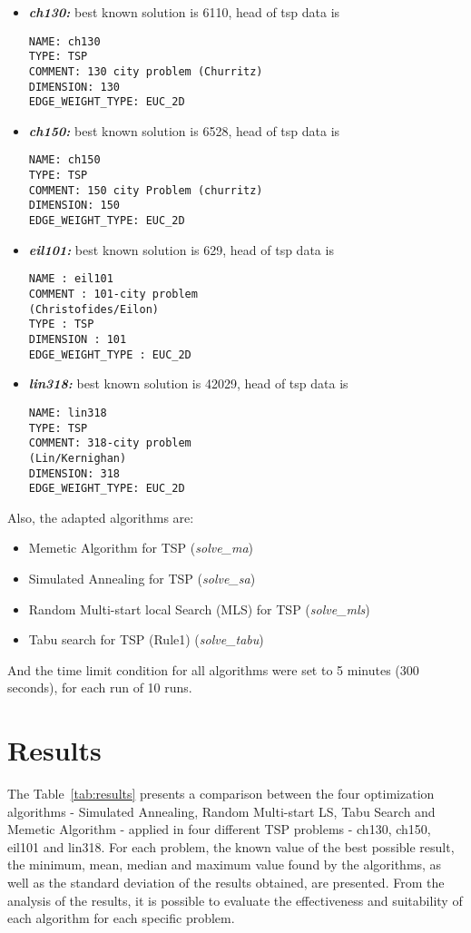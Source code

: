 \documentclass[conference]{IEEEtran}
\begin{document}
\begin{itemize}
	\item \textit{\textbf{ch130:}} best known solution is 6110, head of tsp data is
\begin{verbatim}
NAME: ch130
TYPE: TSP
COMMENT: 130 city problem (Churritz)
DIMENSION: 130
EDGE_WEIGHT_TYPE: EUC_2D
\end{verbatim}
	\item \textit{\textbf{ch150:}} best known solution is 6528, head of tsp data is
\begin{verbatim}
NAME: ch150
TYPE: TSP
COMMENT: 150 city Problem (churritz)
DIMENSION: 150
EDGE_WEIGHT_TYPE: EUC_2D
\end{verbatim}
	\item \textit{\textbf{eil101:}} best known solution is 629, head of tsp data is
\begin{verbatim}
NAME : eil101
COMMENT : 101-city problem 
(Christofides/Eilon)
TYPE : TSP
DIMENSION : 101
EDGE_WEIGHT_TYPE : EUC_2D
\end{verbatim}
	\item \textit{\textbf{lin318:}} best known solution is 42029, head of tsp data is
\begin{verbatim}
NAME: lin318
TYPE: TSP
COMMENT: 318-city problem 
(Lin/Kernighan)
DIMENSION: 318
EDGE_WEIGHT_TYPE: EUC_2D
\end{verbatim}

\end{itemize}

Also, the adapted algorithms are: 

\begin{itemize}
	\item Memetic Algorithm for TSP (\textit{solve\_ma})
	\item Simulated Annealing for TSP (\textit{solve\_sa})
	\item Random Multi-start local Search (MLS) for TSP (\textit{solve\_mls})
	\item Tabu search for TSP (Rule1) (\textit{solve\_tabu})
\end{itemize}

And the time limit condition for all algorithms were set to 5 minutes (300 seconds), for each run of 10 runs. 

\section{Results}

The Table~\ref{tab:results} presents a comparison between the four optimization algorithms - Simulated Annealing, Random Multi-start LS, Tabu Search and Memetic Algorithm - applied in four different TSP problems - ch130, ch150, eil101 and lin318. For each problem, the known value of the best possible result, the minimum, mean, median and maximum value found by the algorithms, as well as the standard deviation of the results obtained, are presented. From the analysis of the results, it is possible to evaluate the effectiveness and suitability of each algorithm for each specific problem.
\end{document}
